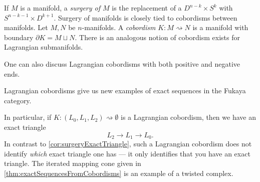 
If $M$ is a manifold, a \emph{surgery of $M$} is the replacement of a $D^{n-k}\times S^k$ with $S^{n-k-1}\times D^{k+1}$. 
Surgery of manifolds is closely tied to cobordisms between manifolds. 
Let $M, N$ be $n$-manifolds. 
A \emph{cobordism} $K: M\rightsquigarrow N$ is a manifold with boundary $\partial K=M\sqcup N$. 
There is an analogous notion of cobordism exists for Lagrangian submanifolds.

One can also discuss Lagrangian cobordisms with both positive and negative ends.



Lagrangian cobordisms give us new examples of exact sequences in the Fukaya category. 

In particular, if $K: (L_0, L_1, L_2)\rightsquigarrow \emptyset$ is a Lagrangian cobordism, then we have an exact triangle
\[L_2\to L_1\to L_0.\]
In contrast to \cref{cor:surgeryExactTriangle}, such a Lagrangian cobordism does not identify \emph{which} exact triangle one has --- it only identifies that you have an exact triangle. 
The iterated mapping cone given in \cref{thm:exactSequencesFromCobordisms} is an example of a twisted complex.